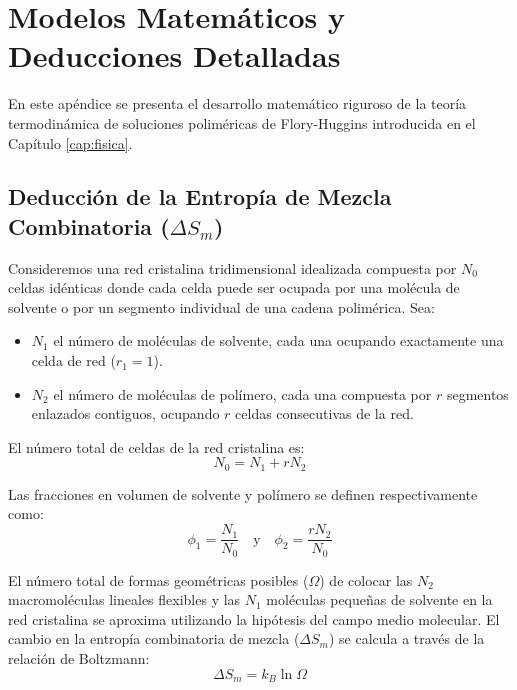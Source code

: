 \chapter{Modelos Matemáticos y Deducciones Detalladas}
\label{ap:apendiceA}

En este apéndice se presenta el desarrollo matemático riguroso de la teoría termodinámica de soluciones poliméricas de Flory-Huggins introducida en el Capítulo \ref{cap:fisica}.

\section{Deducción de la Entropía de Mezcla Combinatoria ($\Delta S_m$)}

Consideremos una red cristalina tridimensional idealizada compuesta por $N_0$ celdas idénticas donde cada celda puede ser ocupada por una molécula de solvente o por un segmento individual de una cadena polimérica. Sea:
\begin{itemize}
    \item $N_1$ el número de moléculas de solvente, cada una ocupando exactamente una celda de red ($r_1 = 1$).
    \item $N_2$ el número de moléculas de polímero, cada una compuesta por $r$ segmentos enlazados contiguos, ocupando $r$ celdas consecutivas de la red.
\end{itemize}

El número total de celdas de la red cristalina es:
\begin{equation}
    N_0 = N_1 + r N_2
    \label{eq:n0_red}
\end{equation}

Las fracciones en volumen de solvente y polímero se definen respectivamente como:
\begin{equation}
    \phi_1 = \frac{N_1}{N_0} \quad \text{y} \quad \phi_2 = \frac{r N_2}{N_0}
    \label{eq:fracciones_vol}
\end{equation}

El número total de formas geométricas posibles ($\Omega$) de colocar las $N_2$ macromoléculas lineales flexibles y las $N_1$ moléculas pequeñas de solvente en la red cristalina se aproxima utilizando la hipótesis del campo medio molecular. El cambio en la entropía combinatoria de mezcla ($\Delta S_m$) se calcula a través de la relación de Boltzmann:
\begin{equation}
    \Delta S_m = k_B \ln \Omega
    \label{eq:boltzmann}
\end{equation}

